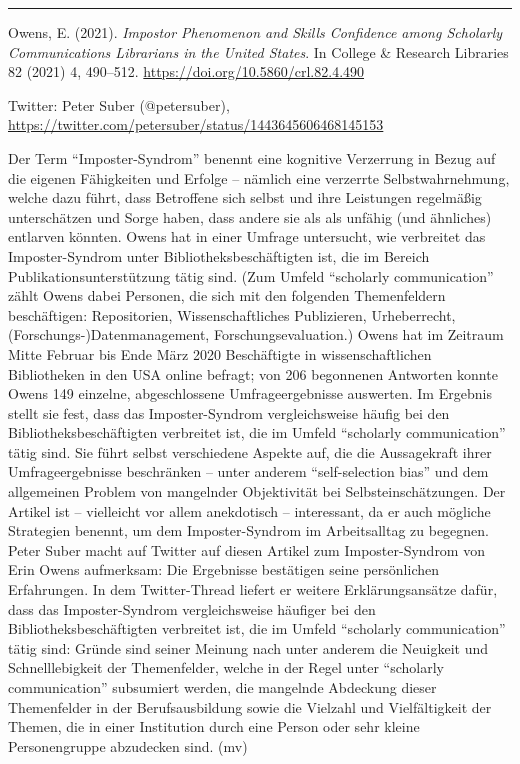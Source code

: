 \documentclass[a4paper,
fontsize=11pt,
oneside,
numbers=noperiodatend,
parskip=half-,
bibliography=totoc,
final
]{scrartcl}
\begin{document}
\begin{center}\rule{0.5\linewidth}{0.5pt}\end{center}

Owens, E. (2021). \emph{Impostor Phenomenon and Skills Confidence among
Scholarly Communications Librarians in the United States}. In College \&
Research Libraries 82 (2021) 4, 490--512.
\url{https://doi.org/10.5860/crl.82.4.490}

Twitter: Peter Suber (@petersuber),
\url{https://twitter.com/petersuber/status/1443645606468145153}

Der Term \enquote{Imposter-Syndrom} benennt eine kognitive Verzerrung in
Bezug auf die eigenen Fähigkeiten und Erfolge -- nämlich eine verzerrte
Selbstwahrnehmung, welche dazu führt, dass Betroffene sich selbst und
ihre Leistungen regelmäßig unterschätzen und Sorge haben, dass andere
sie als als unfähig (und ähnliches) entlarven könnten. Owens hat in
einer Umfrage untersucht, wie verbreitet das Imposter-Syndrom unter
Bibliotheksbeschäftigten ist, die im Bereich Publikationsunterstützung
tätig sind. (Zum Umfeld \enquote{scholarly communication} zählt Owens
dabei Personen, die sich mit den folgenden Themenfeldern beschäftigen:
Repositorien, Wissenschaftliches Publizieren, Urheberrecht,
(Forschungs-)Datenmanagement, Forschungsevaluation.) Owens hat im
Zeitraum Mitte Februar bis Ende März 2020 Beschäftigte in
wissenschaftlichen Bibliotheken in den USA online befragt; von 206
begonnenen Antworten konnte Owens 149 einzelne, abgeschlossene
Umfrageergebnisse auswerten. Im Ergebnis stellt sie fest, dass das
Imposter-Syndrom vergleichsweise häufig bei den Bibliotheksbeschäftigten
verbreitet ist, die im Umfeld \enquote{scholarly communication} tätig
sind. Sie führt selbst verschiedene Aspekte auf, die die Aussagekraft
ihrer Umfrageergebnisse beschränken -- unter anderem
\enquote{self-selection bias} und dem allgemeinen Problem von mangelnder
Objektivität bei Selbsteinschätzungen. Der Artikel ist -- vielleicht vor
allem anekdotisch -- interessant, da er auch mögliche Strategien
benennt, um dem Imposter-Syndrom im Arbeitsalltag zu begegnen.\\
Peter Suber macht auf Twitter auf diesen Artikel zum Imposter-Syndrom
von Erin Owens aufmerksam: Die Ergebnisse bestätigen seine persönlichen
Erfahrungen. In dem Twitter-Thread liefert er weitere Erklärungsansätze
dafür, dass das Imposter-Syndrom vergleichsweise häufiger bei den
Bibliotheksbeschäftigten verbreitet ist, die im Umfeld
\enquote{scholarly communication} tätig sind: Gründe sind seiner Meinung
nach unter anderem die Neuigkeit und Schnelllebigkeit der Themenfelder,
welche in der Regel unter \enquote{scholarly communication} subsumiert
werden, die mangelnde Abdeckung dieser Themenfelder in der
Berufsausbildung sowie die Vielzahl und Vielfältigkeit der Themen, die
in einer Institution durch eine Person oder sehr kleine Personengruppe
abzudecken sind. (mv)
\end{document}
